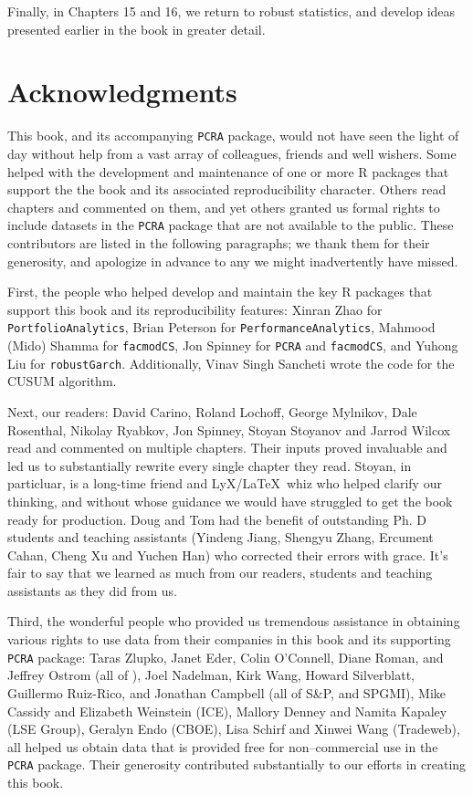 \documentclass[graybox,envcountchap,sectrefs]{svmono}\usepackage[]{graphicx}\usepackage[]{xcolor}
\begin{document}
Finally, in Chapters 15 and 16, we return to robust statistics, and
develop ideas presented earlier in the book in greater detail.

\section*{Acknowledgments}

This book, and its accompanying \texttt{PCRA} package, would not have
seen the light of day without help from a vast array of colleagues,
friends and well wishers. Some helped with the development and maintenance
of one or more R packages that support the the book and its associated
reproducibility character. Others read chapters and commented on them,
and yet others granted us formal rights to include datasets in the
\texttt{PCRA} package that are not available to the public. These
contributors are listed in the following paragraphs; we thank them
for their generosity, and apologize in advance to any we might inadvertently
have missed.

First, the people who helped develop and maintain the key R packages
that support this book and its reproducibility features: Xinran Zhao
for \texttt{PortfolioAnalytics}, Brian Peterson for \texttt{PerformanceAnalytics},
Mahmood (Mido) Shamma for \texttt{facmodCS}, Jon Spinney for \texttt{PCRA}
and \texttt{facmodCS}, and Yuhong Liu for \texttt{robustGarch}. Additionally,
Vinav Singh Sancheti wrote the code for the CUSUM algorithm.

Next, our readers: David Carino, Roland Lochoff, George Mylnikov,
Dale Rosenthal, Nikolay Ryabkov, Jon Spinney, Stoyan Stoyanov and
Jarrod Wilcox read and commented on multiple chapters. Their inputs
proved invaluable and led us to substantially rewrite every single
chapter they read. Stoyan, in particluar, is a long-time friend and
LyX/\LaTeX{}\ whiz who helped clarify our thinking, and without
whose guidance we would have struggled to get the book ready for production.
Doug and Tom had the benefit of outstanding Ph. D students and teaching
assistants (Yindeng Jiang, Shengyu Zhang, Ercument Cahan, Cheng Xu
and Yuchen Han) who corrected their errors with grace. It's fair to
say that we learned as much from our readers, students and teaching
assistants as they did from us.

Third, the wonderful people who provided us tremendous assistance
in obtaining various rights to use data from their companies in this
book and its supporting \texttt{PCRA} package: Taras Zlupko, Janet
Eder, Colin O'Connell, Diane Roman, and Jeffrey Ostrom (all of \CRSPTM),
Joel Nadelman, Kirk Wang, Howard Silverblatt, Guillermo Ruiz-Rico,
and Jonathan Campbell (all of S\&P, and SPGMI), Mike Cassidy and Elizabeth
Weinstein (ICE), Mallory Denney and Namita Kapaley (LSE Group), Geralyn
Endo (CBOE), Lisa Schirf and Xinwei Wang (Tradeweb), all helped us
obtain data that is provided free for non--commercial use in the
\texttt{PCRA} package. Their generosity contributed substantially
to our efforts in creating this book.
\end{document}
